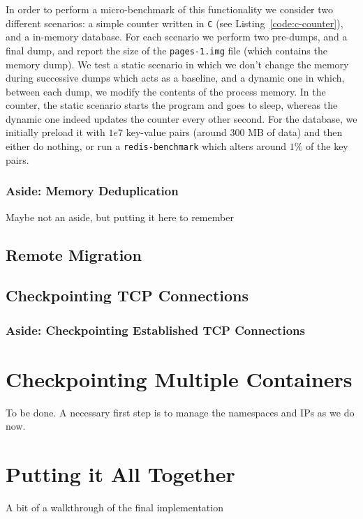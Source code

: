 In order to perform a micro-benchmark of this functionality we consider two different scenarios: a simple counter written in \texttt{C} (see Listing~\ref{code:c-counter}), and a \redis in-memory database.
For each scenario we perform two pre-dumps, and a final dump, and report the size of the \texttt{pages-1.img} file (which contains the memory dump).
We test a static scenario in which we don't change the memory during successive dumps which acts as a baseline, and a dynamic one in which, between each dump, we modify the contents of the process memory.
In the counter, the static scenario starts the program and goes to sleep, whereas the dynamic one indeed updates the counter every other second.
For the database, we initially preload it with $1e7$ key-value pairs (around 300 MB of data) and then either do nothing, or run a \texttt{redis-benchmark} which alters around $1\%$ of the key pairs.


\subsubsection*{Aside: Memory Deduplication}

Maybe not an aside, but putting it here to remember

\subsection{Remote Migration}

\subsection{Checkpointing TCP Connections}

\subsubsection*{Aside: Checkpointing Established TCP Connections}

\section{Checkpointing Multiple Containers}

To be done.
A necessary first step is to manage the namespaces and IPs as we do now.

\section{Putting it All Together}

A bit of a walkthrough of the final implementation
